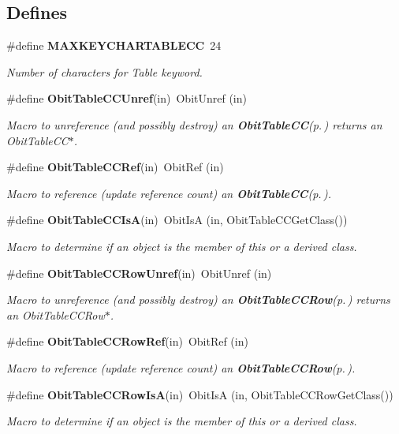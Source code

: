 \subsection*{Defines}
\begin{CompactItemize}
\item 
\#define {\bf MAXKEYCHARTABLECC}\ 24
\begin{CompactList}\small\item\em Number of characters for Table keyword. \item\end{CompactList}\item 
\#define {\bf Obit\-Table\-CCUnref}(in)\ Obit\-Unref (in)
\begin{CompactList}\small\item\em Macro to unreference (and possibly destroy) an {\bf Obit\-Table\-CC}{\rm (p.\,\pageref{structObitTableCC})} returns an Obit\-Table\-CC$\ast$. \item\end{CompactList}\item 
\#define {\bf Obit\-Table\-CCRef}(in)\ Obit\-Ref (in)
\begin{CompactList}\small\item\em Macro to reference (update reference count) an {\bf Obit\-Table\-CC}{\rm (p.\,\pageref{structObitTableCC})}. \item\end{CompactList}\item 
\#define {\bf Obit\-Table\-CCIs\-A}(in)\ Obit\-Is\-A (in, Obit\-Table\-CCGet\-Class())
\begin{CompactList}\small\item\em Macro to determine if an object is the member of this or a derived class. \item\end{CompactList}\item 
\#define {\bf Obit\-Table\-CCRow\-Unref}(in)\ Obit\-Unref (in)
\begin{CompactList}\small\item\em Macro to unreference (and possibly destroy) an {\bf Obit\-Table\-CCRow}{\rm (p.\,\pageref{structObitTableCCRow})} returns an Obit\-Table\-CCRow$\ast$. \item\end{CompactList}\item 
\#define {\bf Obit\-Table\-CCRow\-Ref}(in)\ Obit\-Ref (in)
\begin{CompactList}\small\item\em Macro to reference (update reference count) an {\bf Obit\-Table\-CCRow}{\rm (p.\,\pageref{structObitTableCCRow})}. \item\end{CompactList}\item 
\#define {\bf Obit\-Table\-CCRow\-Is\-A}(in)\ Obit\-Is\-A (in, Obit\-Table\-CCRow\-Get\-Class())
\begin{CompactList}\small\item\em Macro to determine if an object is the member of this or a derived class. \item\end{CompactList}\end{CompactItemize}
